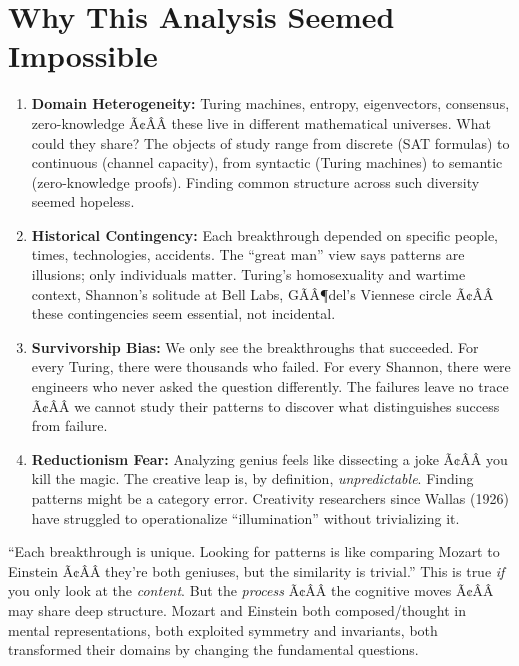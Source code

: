 \section{Why This Analysis Seemed Impossible}
\label{sec:anatomy:impossible}

\begin{enumerate}
\item \textbf{Domain Heterogeneity:} Turing machines, entropy, eigenvectors, consensus, zero-knowledge Ã¢ÂÂ these live in different mathematical universes. What could they share? The objects of study range from discrete (SAT formulas) to continuous (channel capacity), from syntactic (Turing machines) to semantic (zero-knowledge proofs). Finding common structure across such diversity seemed hopeless.

\item \textbf{Historical Contingency:} Each breakthrough depended on specific people, times, technologies, accidents. The ``great man'' view says patterns are illusions; only individuals matter. Turing's homosexuality and wartime context, Shannon's solitude at Bell Labs, GÃÂ¶del's Viennese circle Ã¢ÂÂ these contingencies seem essential, not incidental.

\item \textbf{Survivorship Bias:} We only see the breakthroughs that succeeded. For every Turing, there were thousands who failed. For every Shannon, there were engineers who never asked the question differently. The failures leave no trace Ã¢ÂÂ we cannot study their patterns to discover what distinguishes success from failure.

\item \textbf{Reductionism Fear:} Analyzing genius feels like dissecting a joke Ã¢ÂÂ you kill the magic. The creative leap is, by definition, \emph{unpredictable}. Finding patterns might be a category error. Creativity researchers since Wallas (1926) have struggled to operationalize ``illumination'' without trivializing it.
\end{enumerate}

\begin{roadblockbox}
``Each breakthrough is unique. Looking for patterns is like comparing Mozart to Einstein Ã¢ÂÂ they're both geniuses, but the similarity is trivial.'' This is true \emph{if} you only look at the \emph{content}. But the \emph{process} Ã¢ÂÂ the cognitive moves Ã¢ÂÂ may share deep structure. Mozart and Einstein both composed/thought in mental representations, both exploited symmetry and invariants, both transformed their domains by changing the fundamental questions.

\end{roadblockbox}

